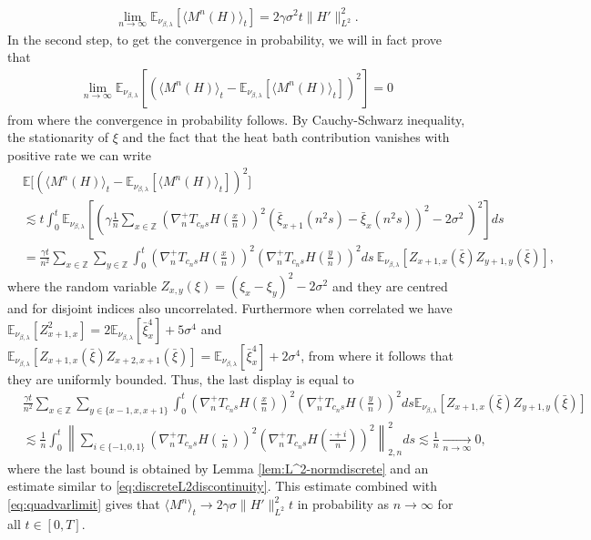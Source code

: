 \documentclass[a4paper, reqno, 12pt]{amsart}
\theoremstyle{plain}
\theoremstyle{definition}
\newcommand{\ee}[1]{\mathbb{E}_{\nu_{\beta,\lambda}}\left[ #1 \right]}
\newcommand{\Z}{\mathbb{Z}}
\begin{document}
\begin{align} \label{eq:quadvarlimit}
    \lim_{n\to\infty} \ee{\langle M^n(H)\rangle_t} = 2\gamma \sigma^2 t\|H'\|_{L^2}^2.
\end{align}
In the second step, to get the convergence in probability, we will in fact prove that 
\begin{align*}
    \lim_{n\to\infty} \ee{ (\langle M^n(H)\rangle_t - \ee{\langle M^n(H)\rangle_t})^2} = 0
\end{align*} from where the convergence in probability follows.  By Cauchy-Schwarz inequality, the stationarity of $\xi$ and the fact that the heat bath contribution vanishes with positive rate we can write 
\begin{align*}
    &\mathbb E\big[ (\langle M^n(H)\rangle_t - \ee{\langle M^n(H)\rangle_t})^2 \big ] \nonumber\\ 
    &\lesssim t\int_0^t\ee{\left( \gamma \frac{1}{n} \sum_{x\in\Z} \left(\nabla^+_n T_{c_ns}H\left(\frac{x}{n}\right)\right)^2 \left(\bar{\xi}_{x+1}(n^2 s) -\bar{\xi}_x(n^2 s)\right)^2 - 2 \sigma ^2 \  \right)^2} ds \nonumber \\ 
    & = \frac{\gamma t}{n^2} \sum_{x\in\Z} \sum_{y\in\Z} \int_0^t \left(\nabla^+_n T_{c_ns}H\left(\frac{x}{n}\right)\right)^2\left(\nabla^+_n T_{c_n s}H\left(\frac{y}{n}\right)\right)^2 ds \ \ee{Z_{x+1,x}(\bar\xi) Z_{y+1,y}(\bar\xi)},
\end{align*}
where the random variable $Z_{x,y}(\xi) = (\xi_{x} -\xi_y)^2-2\sigma^2$ and they are  centred and for disjoint indices also uncorrelated. Furthermore when correlated we have $\ee{Z_{x+1,x}^2} = 2\ee{\bar \xi_x^4} + 5\sigma^4$ and  $\ee{Z_{x+1,x}(\bar\xi) Z_{x+2,x+1}(\bar\xi)} = \ee{\bar\xi^4_{x}} + 2\sigma^4$, from where it follows that they are uniformly bounded. Thus, the last display is equal to 
\begin{align*}
    &\frac{\gamma t}{n^2} \sum_{x\in \Z}\sum_{y\in\{x-1,x,x+1\}} \int_0^t \left(\nabla^+_nT_{c_ns}H\left(\frac{x}{n}\right)\right)^2\left(\nabla^+_nT_{c_n s}H\left(\frac{y}{n}\right)\right)^2 ds \ee{Z_{x+1,x}(\bar\xi) Z_{y+1,y}(\bar\xi)} \\
    &\lesssim\frac{1}{n} \int_0^t \left\| \sum_{i\in\{-1,0,1\}} \left(\nabla^+_n T_{c_ns}H\left(\frac{\cdot}{n}\right)\right)^2\left(\nabla^+_nT_{c_ns}H\left(\frac{\cdot+i}{n}\right)\right)^2\right\|^2_{2,n} ds \lesssim \frac{1}{n}\xrightarrow[n\to\infty]{} 0,
\end{align*}
where the last bound is obtained by Lemma \ref{lem:L^2-normdiscrete} and an estimate similar to \eqref{eq:discreteL2discontinuity}. This estimate combined with \eqref{eq:quadvarlimit} gives that $\langle M^n\rangle_t\to 2\gamma \sigma \| H'\|_{L^2}^2t$ in probability as $n\to\infty$ for all $t\in[0,T]$.
\end{document}
